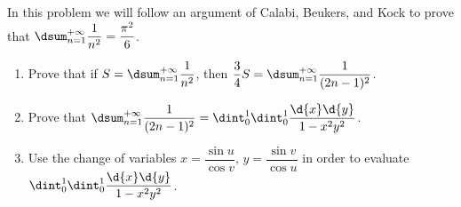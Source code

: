 \begin{exa}In this problem we will follow an argument of Calabi, Beukers, and 
Kock to prove that $\dsum _{n=1}
^{+\infty}\dfrac{1}{n^2}=\dfrac{\pi ^2}{6}$.
\begin{enumerate}
\item
Prove that if $S = \dsum _{n=1} ^{+\infty}\dfrac{1}{n^2}$, then
$\dfrac{3}{4}S = \dsum _{n=1} ^{+\infty}\dfrac{1}{(2n-1)^2}$.
\item Prove that $ \dsum _{n=1} ^{+\infty}\dfrac{1}{(2n-1)^2} = \dint _0 ^1 
\dint _0 ^1
\dfrac{\d{x}\d{y}}{1-x^2y^2}$.
\item Use the change of variables $x=\dfrac{\sin u}{\cos v}$, $y=\dfrac{\sin
v}{\cos u}$ in order to evaluate $\dint _0 ^1 \dint _0 ^1
\dfrac{\d{x}\d{y}}{1-x^2y^2}$.
\end{enumerate}
\label{exa:change_of_var_4}
\end{exa}
